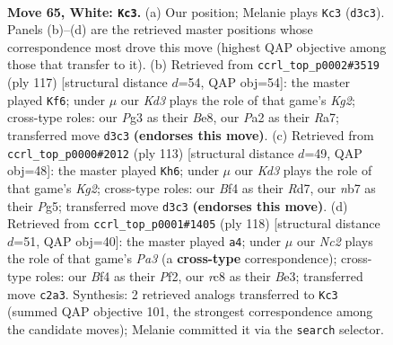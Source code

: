 \documentclass[11pt]{article}
\begin{document}
\clearpage

\begin{figure}[p]\centering
\begin{subfigure}{0.46\textwidth}\centering
\resizebox{\linewidth}{!}{%
\newchessgame
\chessboard[
  setfen={2r5/pn4kr/1p2p3/4P2p/2P2B2/3K2PR/P1N2R2/8 w - - 1 65},
  showmover=false,
  pgfstyle=straightmove, color=movearrow, markmove={d3-c3}
]}
\caption{}
\end{subfigure}\hfill
\begin{subfigure}{0.46\textwidth}\centering
\resizebox{\linewidth}{!}{%
\newchessgame
\chessboard[
  setfen={3rb3/r5kp/3P2p1/2R2p2/3R4/6P1/5PBK/8 b - - 5 59},
  showmover=false,
  pgfstyle=straightmove, color=movearrow, markmove={g7-f6}
]}
\caption{}
\end{subfigure}
\\[4pt]
\begin{subfigure}{0.46\textwidth}\centering
\resizebox{\linewidth}{!}{%
\newchessgame
\chessboard[
  setfen={8/3r2k1/1p3p2/p5pP/P3b1P1/3p3R/1P3K2/3R4 b - - 3 57},
  showmover=false,
  pgfstyle=straightmove, color=movearrow, markmove={g7-h6}
]}
\caption{}
\end{subfigure}\hfill
\begin{subfigure}{0.46\textwidth}\centering
\resizebox{\linewidth}{!}{%
\newchessgame
\chessboard[
  setfen={7r/p5p1/1pnk1p2/7P/2P2P2/P1K1B2R/5P2/8 w - - 3 60},
  showmover=false,
  pgfstyle=straightmove, color=movearrow, markmove={a3-a4}
]}
\caption{}
\end{subfigure}
\caption{\textbf{Move 65, White: \texttt{Kc3}.} (a) Our position; Melanie plays \texttt{Kc3} (\texttt{d3c3}). Panels (b)--(d) are the retrieved master positions whose correspondence most drove this move (highest QAP objective among those that transfer to it). (b) Retrieved from \texttt{ccrl\_top\_p0002\#3519} (ply 117) [structural distance $d$=54, QAP obj=54]: the master played \texttt{Kf6}; under $\mu$ our \emph{Kd3} plays the role of that game's \emph{Kg2}; cross-type roles: our \emph{P}g3 as their \emph{B}e8, our \emph{P}a2 as their \emph{R}a7; transferred move \texttt{d3c3} \textbf{(endorses this move)}. (c) Retrieved from \texttt{ccrl\_top\_p0000\#2012} (ply 113) [structural distance $d$=49, QAP obj=48]: the master played \texttt{Kh6}; under $\mu$ our \emph{Kd3} plays the role of that game's \emph{Kg2}; cross-type roles: our \emph{B}f4 as their \emph{R}d7, our \emph{n}b7 as their \emph{P}g5; transferred move \texttt{d3c3} \textbf{(endorses this move)}. (d) Retrieved from \texttt{ccrl\_top\_p0001\#1405} (ply 118) [structural distance $d$=51, QAP obj=40]: the master played \texttt{a4}; under $\mu$ our \emph{Nc2} plays the role of that game's \emph{Pa3} (a \textbf{cross-type} correspondence); cross-type roles: our \emph{B}f4 as their \emph{P}f2, our \emph{r}c8 as their \emph{B}e3; transferred move \texttt{c2a3}. Synthesis: 2 retrieved analogs transferred to \texttt{Kc3} (summed QAP objective 101, the strongest correspondence among the candidate moves); Melanie committed it via the \texttt{search} selector.}
\label{fig:thought-m128}
\end{figure}
\end{document}
